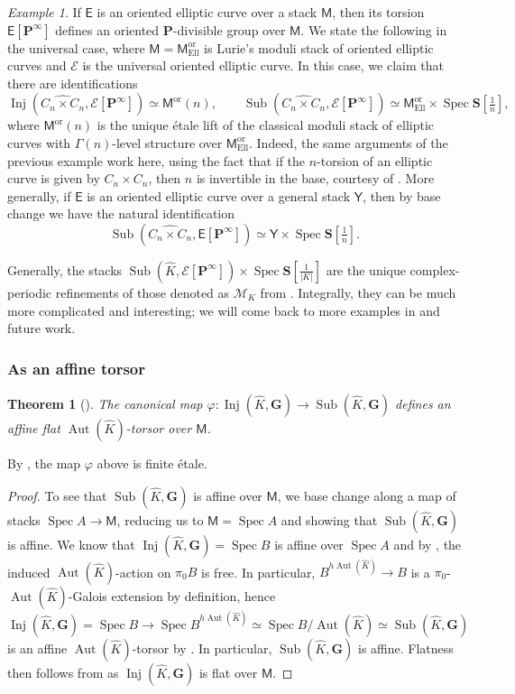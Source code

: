 \documentclass[11pt, a4paper]{article}
\newcommand{\Ell}{\mathrm{Ell}}
\newcommand{\ori}{\mathrm{or}}
\DeclareMathOperator{\Spec}{Spec}
\newcommand{\1}{\mathbf{1}}
\newcommand{\Sph}{\mathbf{S}}
\DeclareMathOperator{\Inj}{Inj}
\DeclareMathOperator{\Sub}{Sub}
\DeclareMathOperator{\Aut}{Aut}
\newcommand{\dual}[1]{{\widehat{#1}}}
\newcommand{\sfE}{\mathsf{E}}
\newcommand{\calE}{\mathcal{E}}
\newcommand{\G}{\mathbf{G}}
\newcommand{\M}{\mathsf{M}}
\renewcommand{\P}{\mathbf{P}}
\newcommand{\Y}{\mathsf{Y}}
\newcommand{\Ga}{\Gamma}
\theoremstyle{plain}
\newtheorem{theorem}[equation]{Theorem}\numberwithin{equation}{section}
\theoremstyle{definition}
\theoremstyle{remark}\numberwithin{equation}{section}
\newtheorem{example}[equation]{Example}
\begin{document}
\begin{example}\label{ex:subforTMF}
    If $\sfE$ is an oriented elliptic curve over a stack $\M$, then its torsion $\sfE[\P^\infty]$ defines an oriented $\P$-divisible group over $\M$. We state the following in the universal case, where $\M=\M_\Ell^\ori$ is Lurie's moduli stack of oriented elliptic curves \cite[]{ec2} and $\calE$ is the universal oriented elliptic curve. In this case, we claim that there are identifications
    \[\Inj(\dual{C_n\times C_n}, \calE[\P^\infty]) \simeq \M^\ori(n), \qquad \Sub(\dual{C_n\times C_n}, \calE[\P^\infty]) \simeq \M_\Ell^\ori \times \Spec \Sph[\tfrac{1}{n}],\]
    where $\M^\ori(n)$ is the unique \'{e}tale lift of the classical moduli stack of elliptic curves with $\Ga(n)$-level structure over $\M_\Ell^\ori$. Indeed, the same arguments of the previous example  work here, using the fact that if the $n$-torsion of an elliptic curve is given by $C_n \times C_n$, then $n$ is invertible in the base, courtesy of \cite[Cor.2.3.2]{km}. More generally, if $\sfE$ is an oriented elliptic curve over a general stack $\Y$, then by base change we have the natural identification
    \[\Sub(\dual{C_n \times C_n}, \sfE[\P^\infty]) \simeq \Y \times \Spec \Sph[\tfrac{1}{n}].\]
\end{example}

Generally, the stacks $\Sub(\dual{K}, \calE[\P^\infty])\times \Spec \Sph[\tfrac{1}{|K|}]$ are the unique complex-periodic refinements of those denoted as $\mathcal{M}_K$ from \cite[Def.2.26]{heckeontmf}. Integrally, they can be much more complicated and interesting; we will come back to more examples in \cite{geometricnorms} and future work.

\subsubsection{As an affine torsor}
\begin{theorem}[{}]\label{thm:geometric_intext}
    The canonical map $\varphi \colon \Inj(\dual{K}, \G) \to \Sub(\dual{K}, \G)$ defines an affine flat $\Aut(\dual{K})$-torsor over $\M$.
\end{theorem}

By , the map $\varphi$ above is finite étale.

\begin{proof}
    To see that $\Sub(\dual{K}, \G)$ is affine over $\M$, we base change along a map of stacks $\Spec A \to \M$, reducing us to $\M=\Spec A$ and showing that $\Sub(\dual{K}, \G)$ is affine. We know that $\Inj(\dual{K},\G) = \Spec B$ is affine over $\Spec A$ and by , the induced $\Aut(\dual{K})$-action on $\pi_0 B$ is free. In particular, $B^{h\Aut(\dual{K})} \to B$ is a $\pi_0$-$\Aut(\dual{K})$-Galois extension by definition, hence
    \[\Inj(\dual{K}, \G) = \Spec B \to \Spec B^{h\Aut(\dual{K})} \simeq \Spec B / \Aut(\dual{K}) \simeq \Sub(\dual{K}, \G)\]
    is an affine $\Aut(\dual{K})$-torsor by . In particular, $\Sub(\dual{K}, \G)$ is affine. Flatness then follows from  as $\Inj(\dual{K}, \G)$ is flat over $\M$.
\end{proof}
\end{document}
